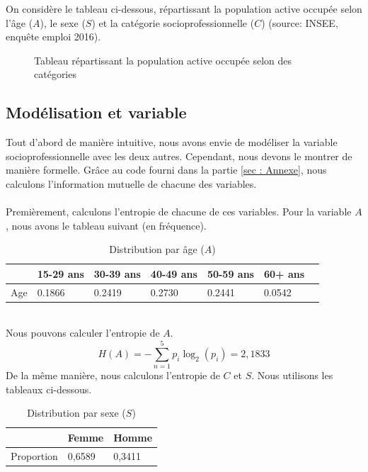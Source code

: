 \documentclass{article}
\begin{document}
On considère le tableau ci-dessous, répartissant la population active occupée selon l'âge ($A$), le sexe ($S$) et la
catégorie socioprofessionnelle ($C$) (source: INSEE, enquête emploi 2016).
\begin{figure}[ht]
  \centering
  \setlength{\fboxsep}{0pt}  %
  \setlength{\fboxrule}{1pt}  %
  \caption{Tableau répartissant la population active occupée selon des catégories }
\end{figure}
\subsection{Modélisation et variable}
\label{1.1}
Tout d'abord de manière intuitive, nous avons envie de modéliser la variable
socioprofessionnelle avec les deux autres. Cependant, nous devons
le montrer de manière formelle. Grâce au code fourni dans la partie \ref{sec : Annexe},
nous calculons l'information mutuelle de chacune des variables.\\\\
Premièrement, calculons l'entropie de chacune de ces variables. Pour la variable $A$, nous avons le tableau suivant (en fréquence). 
\begin{table}[ht]
  \centering
  \caption{Distribution par âge ($A$)}
  \begin{tabular}{|l|l|l|l|l|l|l|}
    \hline
    & 15-29 ans  & 30-39 ans  & 40-49 ans  & 50-59 ans  & 60+ ans \\ \hline
    Age & 0.1866 & 0.2419 & 0.2730 & 0.2441 & 0.0542 \\ \hline
  \end{tabular}
\end{table}
\\
Nous pouvons calculer l'entropie de $A$.\\
\[
H(A) = -\sum_{n = 1}^{5}p_i\log_2(p_i)=2,1833
\]
De la même manière, nous calculons l'entropie de $C$ et $S$. Nous utilisons les tableaux ci-dessous.\\
\begin{table}[H]
  \centering
  \caption{Distribution par sexe ($S$)}
  \begin{tabular}{|l|l|l|}
  \hline
             & Femme  & Homme  \\ \hline
  Proportion & 0,6589 & 0,3411 \\ \hline
  \end{tabular}
\end{table}
\end{document}
